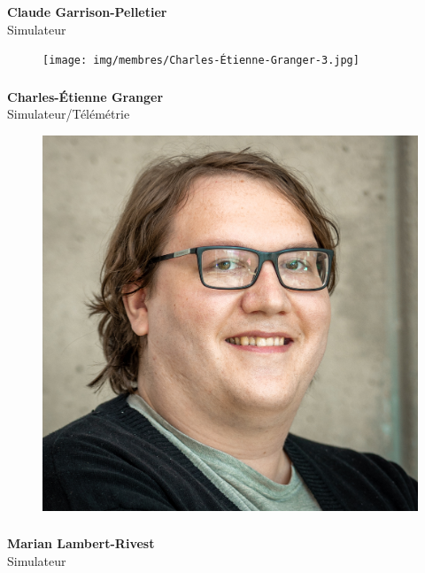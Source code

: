 \documentclass[a0paper,portrait]{baposter}
\begin{document}
\begin{poster}
{\subsubsection*{}
\vspace{2mm}
\textbf{Claude Garrison-Pelletier}\\
Simulateur

\begin{figure}
\texttt{[image: img/membres/Charles-Étienne-Granger-3.jpg]} 
\end{figure}
\subsubsection*{}
\vspace{2mm}
\textbf{Charles-Étienne Granger}\\
Simulateur/Télémétrie

\begin{figure}
\includegraphics[width=.9\linewidth]{img/membres/Marian-Lambert-Rivest-3.jpg} 
\end{figure}
\subsubsection*{}
\vspace{2mm}
\textbf{Marian Lambert-Rivest}\\
Simulateur

}
\end{poster}
\end{document}
